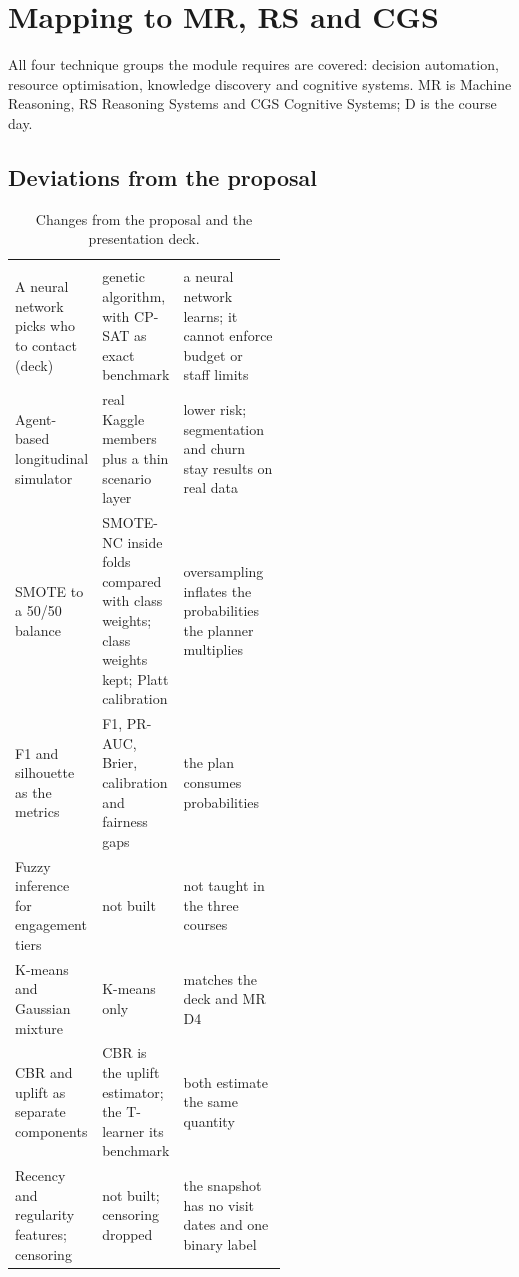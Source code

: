 \chapter{Mapping to MR, RS and CGS}
\label{app:mapping}

All four technique groups the module requires are covered: decision automation, resource optimisation, knowledge discovery and cognitive systems. MR is Machine Reasoning, RS Reasoning Systems and CGS Cognitive Systems; D is the course day.



\section*{Deviations from the proposal}

{\small\sffamily
\begin{xltabular}{\linewidth}{@{}P{0.27\linewidth} P{0.27\linewidth} L@{}}
  \caption{Changes from the proposal and the presentation deck.}\label{tab:deviations}\\
  \toprule
   &  &  \\
  \midrule
  \endfirsthead
  \toprule
   &  &  \\
  \midrule
  \endhead
  A neural network picks who to contact (deck) & genetic algorithm, with CP-SAT as exact benchmark & a neural network learns; it cannot enforce budget or staff limits \\
  Agent-based longitudinal simulator & real Kaggle members plus a thin scenario layer & lower risk; segmentation and churn stay results on real data \\
  SMOTE to a 50/50 balance & SMOTE-NC inside folds compared with class weights; class weights kept; Platt calibration & oversampling inflates the probabilities the planner multiplies \\
  F1 and silhouette as the metrics & F1, PR-AUC, Brier, calibration and fairness gaps & the plan consumes probabilities \\
  Fuzzy inference for engagement tiers & not built & not taught in the three courses \\
  K-means and Gaussian mixture & K-means only & matches the deck and MR D4 \\
  CBR and uplift as separate components & CBR is the uplift estimator; the T-learner its benchmark & both estimate the same quantity \\
  Recency and regularity features; censoring & not built; censoring dropped & the snapshot has no visit dates and one binary label \\

\end{xltabular}}
